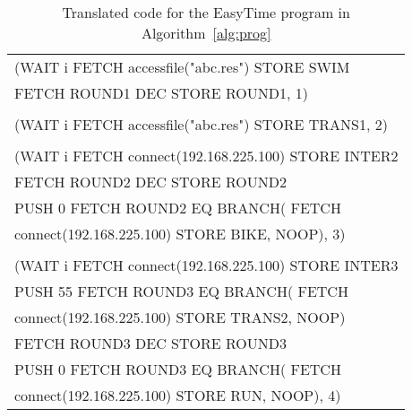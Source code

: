 \documentclass[preprint, prX]{revtex4}
\begin{document}
\begin{table}[htb]
\caption{Translated code for the EasyTime program in Algorithm~\ref{alg:prog}}
\label{tab:tab10}
\begin{center}
\vspace{-5mm}
\small
\begin{tabular}{ | l | }
\hline
(WAIT i FETCH accessfile("abc.res") STORE SWIM \\
FETCH ROUND1 DEC STORE ROUND1, 1) \\ \\
(WAIT i FETCH accessfile("abc.res") STORE TRANS1, 2) \\ \\
(WAIT i FETCH connect(192.168.225.100) STORE INTER2 \\
FETCH ROUND2 DEC STORE ROUND2 \\
PUSH 0  FETCH ROUND2  EQ BRANCH( FETCH \\
connect(192.168.225.100) STORE BIKE, NOOP), 3) \\ \\
(WAIT i FETCH connect(192.168.225.100) STORE INTER3 \\
PUSH 55  FETCH ROUND3  EQ BRANCH( FETCH \\
connect(192.168.225.100) STORE TRANS2, NOOP) \\
FETCH ROUND3 DEC STORE ROUND3 \\
PUSH 0  FETCH ROUND3  EQ BRANCH( FETCH \\
connect(192.168.225.100) STORE RUN, NOOP), 4) \\
\hline
\end{tabular}
\vspace{-5mm}
\normalsize
\end{center}
\end{table}
\end{document}
